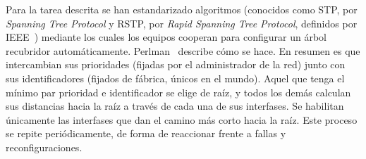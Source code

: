   Para la tarea descrita se han estandarizado algoritmos
  (conocidos como STP,%
   por \emph{\foreignlanguage{english}{Spanning Tree Protocol}}
   y RSTP,%
   por \emph{\foreignlanguage{english}{Rapid Spanning Tree Protocol}},
   definidos por IEEE~\cite{ieee:_802.1d-2004})
  mediante los cuales
  los equipos cooperan para
  configurar un árbol recubridor automáticamente.
  Perlman~%
    \cite{Perlman:1985:ADC:318951.319004}
  describe cómo se hace.
  En resumen
  es que intercambian sus prioridades
  (fijadas por el administrador de la red)
  junto con sus identificadores
  (fijados de fábrica, únicos en el mundo).
  Aquel que tenga el mínimo par prioridad e identificador
  se elige de raíz,
  y todos los demás calculan sus distancias hacia la raíz
  a través de cada una de sus interfases.
  Se habilitan únicamente las interfases
  que dan el camino más corto hacia la raíz.
  Este proceso se repite periódicamente,
  de forma de reaccionar frente a fallas y reconfiguraciones.

